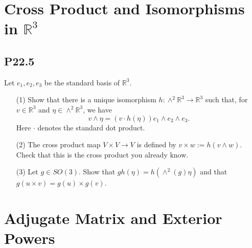 \documentclass[lang=cn,11pt]{template}
\begin{document}
\section{Cross Product and Isomorphisms in \(\mathbb{R}^3\)}

\subsection*{P22.5}
Let \( e_1, e_2, e_3 \) be the standard basis of \( \mathbb{R}^3 \).
\begin{itemize}
    \item[(1)] Show that there is a unique isomorphism \( h : \wedge^2 \mathbb{R}^3 \rightarrow \mathbb{R}^3 \) such that, for \( v \in \mathbb{R}^3 \) and \( \eta \in \wedge^2 \mathbb{R}^3 \), we have
    \[
    v \wedge \eta = (v \cdot h(\eta)) e_1 \wedge e_2 \wedge e_3.
    \]
    Here \( \cdot \) denotes the standard dot product.
    \item[(2)] The cross product map \( V \times V \rightarrow V \) is defined by \( v \times w := h(v \wedge w) \). Check that this is the cross product you already know.
    \item[(3)] Let \( g \in SO(3) \). Show that \( g h(\eta) = h(\wedge^2(g) \eta) \) and that \( g(u \times v) = g(u) \times g(v) \).
\end{itemize}

\section{Adjugate Matrix and Exterior Powers}
\end{document}
